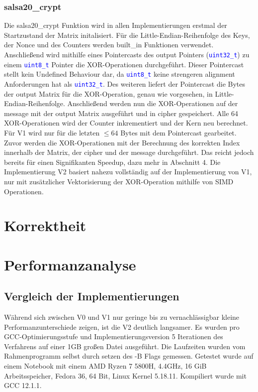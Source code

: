 \documentclass[course=erap]{aspdoc}
\begin{document}
\subsubsection{salsa20\_crypt} \label{crypt}
Die salsa20\_crypt Funktion wird in allen Implementierungen erstmal der Startzustand der Matrix initalisiert. Für die Little-Endian-Reihenfolge des Keys, der Nonce und des Counters werden built\_in Funktionen verwendet.
Anschließend wird mithilfe eines Pointercasts des output Pointers (\texttt{\textcolor{blue}{uint32\_t}}) zu einem \texttt{\textcolor{blue}{uint8\_t}} Pointer die XOR-Operationen durchgeführt. Dieser Pointercast stellt kein Undefined Behaviour dar, 
da \texttt{\textcolor{blue}{uint8\_t}} keine strengeren alignment Anforderungen hat als \texttt{\textcolor{blue}{uint32\_t}}. Des weiteren liefert der Pointercast die Bytes der output Matrix für die XOR-Operation, genau wie vorgesehen, in Little-Endian-Reihenfolge.
Anschließend werden nun die XOR-Operationen auf der message mit der output Matrix ausgeführt und in cipher gespeichert. Alle 64 XOR-Operationen wird der Counter inkrementiert und der Kern neu berechnet. Für V1 wird nur für die letzten $\leq 64$ Bytes mit dem Pointercast gearbeitet.
Zuvor werden die XOR-Operationen mit der Berechnung des korrekten Index innerhalb der Matrix, der cipher und der message durchgeführt. Das reicht jedoch bereits für einen Signifikanten Speedup, dazu mehr in Abschnitt 4.
Die Implementierung V2 basiert nahezu vollständig auf der Implementierung von V1, nur mit zusätzlicher Vektorisierung der XOR-Operation mithilfe von SIMD Operationen.


\section{Korrektheit}

\section{Performanzanalyse}
\subsection{Vergleich der Implementierungen}
Während sich zwischen V0 und V1 nur geringe bis zu vernachlässigbar kleine 
Performanzunterschiede zeigen, ist die V2 deutlich langsamer.
Es wurden pro GCC-Optimierungsstufe und Implementierungsversion 5 
Iterationen des Verfahrens auf einer 1GB großen Datei ausgeführt.
Die Laufzeiten wurden vom Rahmenprogramm selbst durch setzen des -B Flags
gemessen. Getestet wurde auf einem Notebook mit einem AMD Ryzen 7 5800H, 
4.4GHz, 16 GiB Arbeitsspeicher, Fedora 36, 64 Bit, Linux Kernel 5.18.11.
Kompiliert wurde mit GCC 12.1.1.
\end{document}
